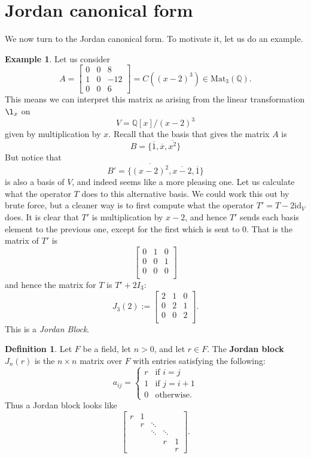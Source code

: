 \documentclass[12pt]{report}
\numberwithin{equation}{section}
\numberwithin{theorem}{chapter}
\theoremstyle{definition}
\newtheorem{definition}[theorem]{Definition}
\newtheorem{example}[theorem]{Example}
\newtheorem*{basic properties}{Basic Properties}
\newtheorem*{Important Remark}{Important Remark}
\newcommand{\df}[1]{{\bf #1}\index{#1}}
\begin{document}
\section{Jordan canonical form}

We now turn to the Jordan canonical form. To motivate it, let us do an example.

\begin{example}\label{example JCF}
Let us consider
$$A =
\begin{bmatrix}
0 & 0 & 8 \\
1 & 0 & -12 \\
0 & 0 & 6 
\end{bmatrix}=C((x-2)^3)\in \mathrm{Mat}_3(\mathbb{Q}).$$
 This means we can interpret this matrix as arising from the linear transformation $\l_x$ on 
$$V = \mathbb{Q}[x]/(x-2)^3$$
given by multiplication by $x$. Recall that the basis that gives the matrix $A$ is
$$B=\{\overline{1}, \overline{x}, \overline{x^2}\}$$
But notice that 
$$B' = \{\overline{(x-2)^2}, \overline{x-2}, \overline{1}\}$$
is also a basis of $V$, and indeed seems like a more pleasing one. 
Let us calculate what the operator $T$ does to this alternative basis. We could work this out by brute force, but a cleaner way is to first compute what the operator $T' = T -2 \mathrm{id}_V$ does. It is clear that $T'$ is multiplication by $x-2$, and hence $T'$ sends each basis element to the previous one, except for the first which is sent to $0$. That is the matrix of $T'$ is
$$\begin{bmatrix}
0 & 1 & 0 \\
0 & 0 & 1 \\
0 & 0 & 0 \\
\end{bmatrix}$$
and hence the matrix for $T$ is $T' + 2 I_3$:
$$J_3(2) := 
\begin{bmatrix}
2 & 1 & 0 \\
0 & 2 & 1 \\
0 & 0 & 2 \\
\end{bmatrix}.$$
This is a \emph{Jordan Block}. 
\end{example}

\begin{definition}
Let $F$ be a field, let $n > 0$, and let $r \in F$. The \df{Jordan block} $J_n(r)$ is the $n \times n$ matrix over $F$ with entries satisfying the following:
$$a_{ij} = \begin{cases} 
r & \textrm{if } i=j \\ 
1 & \textrm{if } j=i+1 \\
0 & \textrm{otherwise}.
\end{cases}
$$
Thus a Jordan block looks like
$$\begin{bmatrix}
r & 1 &  \\
& r & \ddots \\
& & \ddots & \ddots\\
& & & r & 1\\
&&&& r	
\end{bmatrix}.
$$
\end{definition}
\end{document}
